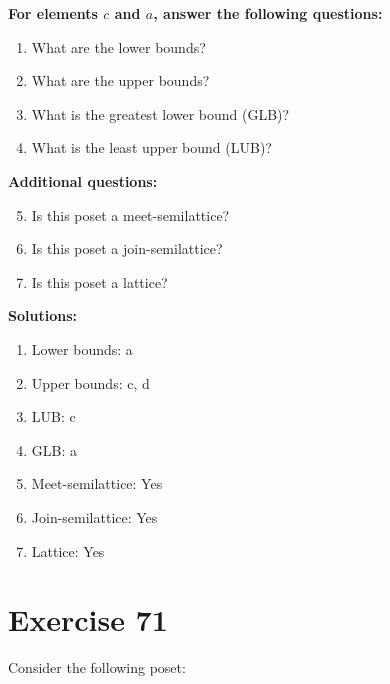 \documentclass{article}
\begin{document}
    \textbf{For elements $c$ and $a$, answer the following questions:}
\begin{enumerate}
    \item What are the lower bounds?
    \item What are the upper bounds?
    \item What is the greatest lower bound (GLB)?
    \item What is the least upper bound (LUB)?
\end{enumerate}
    \hspace*{3ex} \textbf{Additional questions:}
\begin{enumerate}
    \setcounter{enumi}{4}
    \item Is this poset a meet-semilattice?
    \item Is this poset a join-semilattice?
    \item Is this poset a lattice?
\end{enumerate}

\textbf{Solutions:}
\begin{enumerate}
    \item Lower bounds: {a}
    \item Upper bounds: {c, d}
    \item LUB: c
    \item GLB: a
    \item Meet-semilattice: Yes
    \item Join-semilattice: Yes
    \item Lattice: Yes
\end{enumerate}
\newpage
\section*{Exercise 71}
Consider the following poset:
\begin{center}
\end{center}
\end{document}
